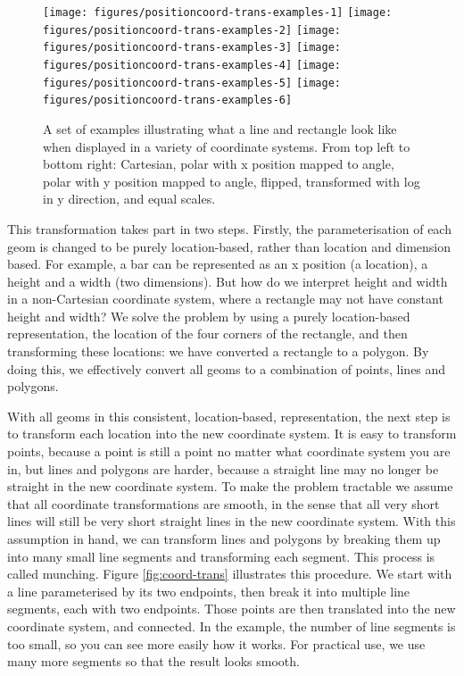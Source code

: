 \begin{figure}

{\centering \texttt{[image: figures/positioncoord-trans-examples-1]} \texttt{[image: figures/positioncoord-trans-examples-2]} \texttt{[image: figures/positioncoord-trans-examples-3]} \texttt{[image: figures/positioncoord-trans-examples-4]} \texttt{[image: figures/positioncoord-trans-examples-5]} \texttt{[image: figures/positioncoord-trans-examples-6]} 

}

\caption{A set of examples illustrating what a line and rectangle look like when displayed in a variety of coordinate systems.  From top left to bottom right: Cartesian, polar with x position mapped to angle, polar with y position mapped to angle, flipped, transformed with log in y direction, and equal scales.\label{fig:coord-trans-examples}}
\end{figure}

This transformation takes part in two steps. Firstly, the
parameterisation of each geom is changed to be purely location-based,
rather than location and dimension based. For example, a bar can be
represented as an x position (a location), a height and a width (two
dimensions). But how do we interpret height and width in a non-Cartesian
coordinate system, where a rectangle may not have constant height and
width? We solve the problem by using a purely location-based
representation, the location of the four corners of the rectangle, and
then transforming these locations: we have converted a rectangle to a
polygon. By doing this, we effectively convert all geoms to a
combination of points, lines and polygons.
 

With all geoms in this consistent, location-based, representation, the
next step is to transform each location into the new coordinate system.
It is easy to transform points, because a point is still a point no
matter what coordinate system you are in, but lines and polygons are
harder, because a straight line may no longer be straight in the new
coordinate system. To make the problem tractable we assume that all
coordinate transformations are smooth, in the sense that all very short
lines will still be very short straight lines in the new coordinate
system. With this assumption in hand, we can transform lines and
polygons by breaking them up into many small line segments and
transforming each segment. This process is called munching.
 Figure \ref{fig:coord-trans} illustrates this
procedure. We start with a line parameterised by its two endpoints, then
break it into multiple line segments, each with two endpoints. Those
points are then translated into the new coordinate system, and
connected. In the example, the number of line segments is too small, so
you can see more easily how it works. For practical use, we use many
more segments so that the result looks smooth.

